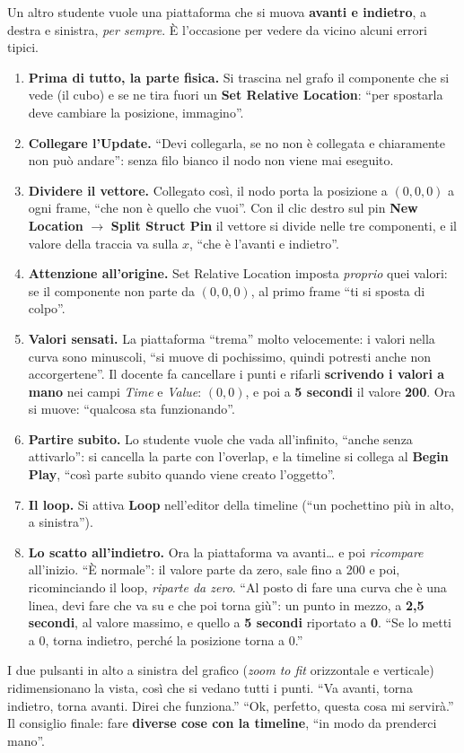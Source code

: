 Un altro studente vuole una piattaforma che si muova \textbf{avanti e indietro},
a destra e sinistra, \emph{per sempre}. È l'occasione per vedere da vicino
alcuni errori tipici.
\begin{enumerate}
  \item \textbf{Prima di tutto, la parte fisica.} Si trascina nel grafo il
        componente che si vede (il cubo) e se ne tira fuori un \textbf{Set
        Relative Location}: ``per spostarla deve cambiare la posizione,
        immagino''.
  \item \textbf{Collegare l'Update.} ``Devi collegarla, se no non è
        collegata e chiaramente non può andare'': senza filo bianco il nodo non
        viene mai eseguito.
  \item \textbf{Dividere il vettore.} Collegato così, il nodo porta la
        posizione a $(0,0,0)$ a ogni frame, ``che non è quello che vuoi''. Con
        il clic destro sul pin \textbf{New Location} $\rightarrow$
        \textbf{Split Struct Pin} il vettore si divide nelle tre componenti, e
        il valore della traccia va sulla \textbf{$x$}, ``che è l'avanti e
        indietro''.
  \item \textbf{Attenzione all'origine.} Set Relative Location imposta
        \emph{proprio} quei valori: se il componente non parte da $(0,0,0)$,
        al primo frame ``ti si sposta di colpo''.
  \item \textbf{Valori sensati.} La piattaforma ``trema'' molto velocemente:
        i valori nella curva sono minuscoli, ``si muove di pochissimo, quindi
        potresti anche non accorgertene''. Il docente fa cancellare i punti e
        rifarli \textbf{scrivendo i valori a mano} nei campi \emph{Time} e
        \emph{Value}: $(0, 0)$, e poi a \textbf{5 secondi} il valore
        \textbf{200}. Ora si muove: ``qualcosa sta funzionando''.
  \item \textbf{Partire subito.} Lo studente vuole che vada all'infinito,
        ``anche senza attivarlo'': si cancella la parte con l'overlap, e la
        timeline si collega al \textbf{Begin Play}, ``così parte subito quando
        viene creato l'oggetto''.
  \item \textbf{Il loop.} Si attiva \textbf{Loop} nell'editor della
        timeline (``un pochettino più in alto, a sinistra'').
  \item \textbf{Lo scatto all'indietro.} Ora la piattaforma va avanti\dots{} e
        poi \emph{ricompare} all'inizio. ``È normale'': il valore parte da
        zero, sale fino a 200 e poi, ricominciando il loop, \emph{riparte da
        zero}. ``Al posto di fare una curva che è una linea, devi fare che va
        su e che poi torna giù'': un punto in mezzo, a \textbf{2,5 secondi}, al
        valore massimo, e quello a \textbf{5 secondi} riportato a
        \textbf{0}. ``Se lo metti a 0, torna indietro, perché la posizione
        torna a 0.''
\end{enumerate}
I due pulsanti in alto a sinistra del grafico (\emph{zoom to fit} orizzontale e
verticale) ridimensionano la vista, così che si vedano tutti i punti. ``Va
avanti, torna indietro, torna avanti. Direi che funziona.'' ``Ok, perfetto,
questa cosa mi servirà.'' Il consiglio finale: fare \textbf{diverse cose con la
timeline}, ``in modo da prenderci mano''.

